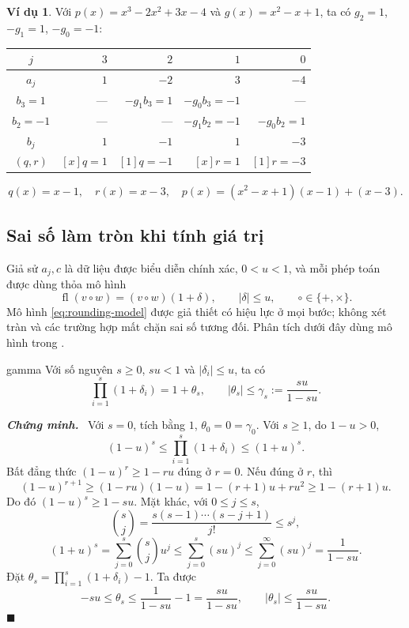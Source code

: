 \documentclass[12pt,a4paper,oneside]{book}
\numberwithin{algorithm}{chapter}
\theoremstyle{definition}
\newtheorem{vidu}{Ví dụ}[chapter]
\newenvironment{chungminh}{\par\medskip\noindent\textbf{\textit{\color{mainblue}Chứng minh.}}\ }{\hfill$\blacksquare$\par\medskip}
\newcommand{\fl}{\operatorname{fl}}
\begin{document}
\begin{vidu}
Với $p(x)=x^3-2x^2+3x-4$ và $g(x)=x^2-x+1$, ta có $g_2=1$, $-g_1=1$, $-g_0=-1$:
\begin{center}
\begin{tabular}{c|rr|rr}
\toprule
$j$ & $3$ & $2$ & $1$ & $0$\\
\midrule
$a_j$ & $1$ & $-2$ & $3$ & $-4$\\
$b_3=1$ & --- & $-g_1b_3=1$ & $-g_0b_3=-1$ & ---\\
$b_2=-1$ & --- & --- & $-g_1b_2=-1$ & $-g_0b_2=1$\\
\midrule
$b_j$ & $1$ & $-1$ & $1$ & $-3$\\
\midrule
$(q,r)$ & $[x]q=1$ & $[1]q=-1$ & $[x]r=1$ & $[1]r=-3$\\
\bottomrule
\end{tabular}
\end{center}
\[
 q(x)=x-1,\quad r(x)=x-3,\quad
 p(x)=(x^2-x+1)(x-1)+(x-3).
\]
\end{vidu}

\subsection{Sai số làm tròn khi tính giá trị}
Giả sử $a_j,c$ là dữ liệu được biểu diễn chính xác, $0<u<1$, và mỗi phép toán được dùng thỏa mô hình
\begin{equation}\label{eq:rounding-model}
 \fl(v\mathbin\circ w)=(v\mathbin\circ w)(1+\delta),
 \qquad |\delta|\leq u,\qquad\circ\in\{+,\times\}.
\end{equation}
Mô hình \eqref{eq:rounding-model} được giả thiết có hiệu lực ở mọi bước; không xét tràn và các trường hợp mất chặn sai số tương đối. Phân tích dưới đây dùng mô hình trong \cite{bindel}.

\begin{bode}{}{gamma}
Với số nguyên $s\geq0$, $su<1$ và $|\delta_i|\leq u$, ta có
\[
 \prod_{i=1}^{s}(1+\delta_i)=1+\theta_s,
 \qquad |\theta_s|\leq\gamma_s:=\frac{su}{1-su}.
\]
\end{bode}
\begin{chungminh}
Với $s=0$, tích bằng $1$, $\theta_0=0=\gamma_0$. Với $s\geq1$, do $1-u>0$,
\[
 (1-u)^s\leq\prod_{i=1}^{s}(1+\delta_i)\leq(1+u)^s.
\]
Bất đẳng thức $(1-u)^r\geq1-ru$ đúng ở $r=0$. Nếu đúng ở $r$, thì
\[
 (1-u)^{r+1}\geq(1-ru)(1-u)
 =1-(r+1)u+ru^2\geq1-(r+1)u.
\]
Do đó $(1-u)^s\geq1-su$. Mặt khác, với $0\leq j\leq s$,
\[
 \binom{s}{j}=\frac{s(s-1)\cdots(s-j+1)}{j!}\leq s^j,
\]
\[
 (1+u)^s=\sum_{j=0}^{s}\binom{s}{j}u^j
 \leq\sum_{j=0}^{s}(su)^j
 \leq\sum_{j=0}^{\infty}(su)^j=\frac{1}{1-su}.
\]
Đặt $\theta_s=\prod_{i=1}^{s}(1+\delta_i)-1$. Ta được
\[
 -su\leq\theta_s\leq\frac{1}{1-su}-1=\frac{su}{1-su},
 \qquad |\theta_s|\leq\frac{su}{1-su}.
\]
\end{chungminh}
\end{document}
